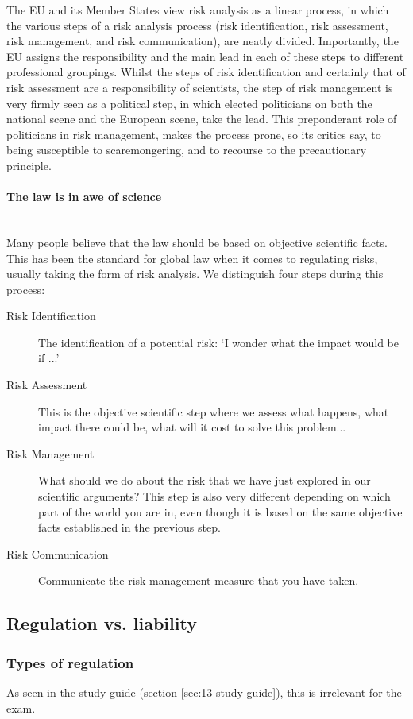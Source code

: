 \documentclass[../summary.tex]{subfiles}
\begin{document}
				The EU and its Member States view risk analysis as a linear process, in which the various steps of a risk analysis process (risk identification, risk assessment, risk management, and risk communication), are neatly divided. Importantly, the EU assigns the responsibility and the main lead in each of these steps to different professional groupings. Whilst the steps of risk identification and certainly that of risk assessment are a responsibility of scientists, the step of risk management is very firmly seen as a political step, in which elected politicians on both the national scene and the European scene, take the lead. This preponderant role of politicians in risk management, makes the process prone, so its critics say, to being susceptible to scaremongering, and to recourse to the precautionary principle.
				
			\paragraph{The law is in awe of science}\mbox{}\\
				Many people believe that the law should be based on objective scientific facts. This has been the standard for global law when it comes to regulating risks, usually taking the form of risk analysis. We distinguish four steps during this process:
				\begin{description}
					\item[Risk Identification] The identification of a potential risk: `I wonder what the impact would be if ...'
					\item[Risk Assessment] This is the objective scientific step where we assess what happens, what impact there could be, what will it cost to solve this problem... 
					\item[Risk Management] What should we do about the risk that we have just explored in our scientific arguments? This step is also very different depending on which part of the world you are in, even though it is based on the same objective facts established in the previous step.
					\item[Risk Communication] Communicate the risk management measure that you have taken. 
				\end{description} 
				
	\subsection{Regulation vs. liability}
		\subsubsection{Types of regulation}
			As seen in the study guide (section \ref{sec:13-study-guide}), this is irrelevant for the exam.
		
\end{document}
